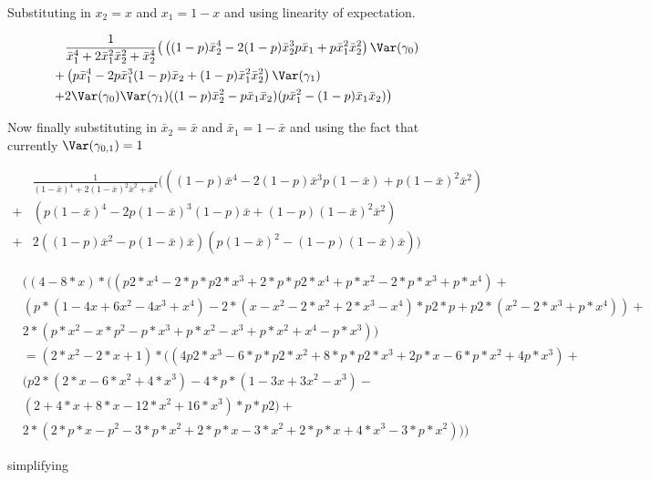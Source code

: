Substituting in $x_2 = x$ and $x_1 = 1 - x$ and using linearity of expectation.

\begin{align*}
	 &\frac{1}{\bar{x}_1^4 + 2\bar{x}_1^2 \bar{x}_2^2 + \bar{x}_2^4} 
	 \big( \left((1-p) \bar{x}_2^4  - 2 (1-p) \bar{x}_2^3 p \bar{x}_1 + p \bar{x}_1^2 \bar{x}_2^2\right)\Var(\gamma_0) \\
	+ &\left(p \bar{x}_1^4  - 2 p \bar{x}_1^3 (1-p) \bar{x}_2 + (1-p) \bar{x}_1^2 \bar{x}_2^2\right)\Var(\gamma_1) \\
	+ & 2 \Var(\gamma_0) \Var(\gamma_1)((1-p) \bar{x}_2^2 - p \bar{x}_1 \bar{x}_2) (p \bar{x}_1^2 - (1-p) \bar{x}_1 \bar{x}_2) \big)
\end{align*} 

Now finally substituting in $\bar x_2 = \bar x$ and $\bar x_1 = 1 - \bar x$ and using the fact that currently $\Var(\gamma_{0,1}) =1$

\begin{align*}
	 &\frac{1}{(1 - \bar{x})^4 + 2(1 - \bar{x})^2 \bar{x}^2 + \bar{x}^4} 
	 \big( \left((1-p) \bar{x}^4  - 2 (1-p) \bar{x}^3 p (1 - \bar{x}) + p (1 - \bar{x})^2 \bar{x}^2\right) \\
	+ &\left(p (1 - \bar{x})^4  - 2 p (1 - \bar{x})^3 (1-p) \bar{x} + (1-p) (1 - \bar{x})^2 \bar{x}^2\right) \\
	+ & 2 ((1-p) \bar{x}^2 - p (1 - \bar{x}) \bar{x}) (p (1 - \bar{x})^2 - (1-p) (1 - \bar{x}) \bar{x}) \big)
\end{align*} 


\begin{align*}
&((4 - 8*x) * ((p2 * x^4 - 2 * p * p2 * x^3 + 2 * p*p2*x^4 + p*x^2 -2*p*x^3 + p*x^4) + \\
&(p*(1-4x + 6x^2 - 4x^3 + x^4) - 2*(x - x^2 - 2*x^2 + 2*x^3 - x^4)*p2*p + p2*(x^2 - 2*x^3 + p*x^4)) + \\ 
&2*(p*x^2 - x*p^2 - p*x^3 + p*x^2 - x^3 + p*x^2 + x^4 - p*x^3)) \\
&= (2*x^2 - 2*x + 1)*((4 p2 * x^3 - 6 * p * p2 * x^2 + 8 * p*p2*x^3 + 2 p*x -6*p*x^2 + 4 p*x^3) + \\
&(p2*(2*x - 6*x^2 + 4*x^3) - 4*p*(1 - 3x + 3x^2 - x^3) - \\
&(2 + 4*x + 8*x - 12*x^2 + 16*x^3 )*p*p2 )+ \\
&2*(2*p*x - p^2 - 3*p*x^2 + 2*p*x - 3*x^2 + 2*p*x + 4*x^3 - 3*p*x^2)))
\end{align*} 

simplifying 

